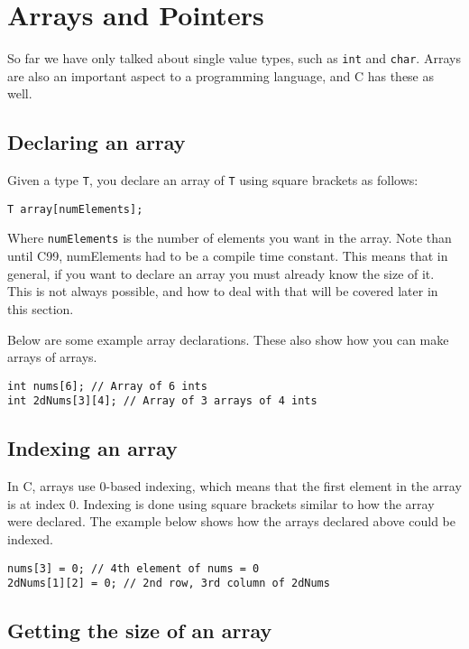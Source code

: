 
\chapter{Arrays and Pointers}

So far we have only talked about single value types, such as \texttt{int} and \texttt{char}.
Arrays are also an important aspect to a programming language, and C has these as well.

\section{Declaring an array}

Given a type \texttt{T}, you declare an array of \texttt{T} using square brackets as follows:

\begin{lstlisting}[numbers=none,frame=none]
T array[numElements];
\end{lstlisting}

Where \texttt{numElements} is the number of elements you want in the array.
Note than until C99, numElements had to be a compile time constant.
This means that in general, if you want to declare an array you must already know the size of it.
This is not always possible, and how to deal with that will be covered later in this section.

Below are some example array declarations.
These also show how you can make arrays of arrays.

\begin{lstlisting}
int nums[6]; // Array of 6 ints
int 2dNums[3][4]; // Array of 3 arrays of 4 ints
\end{lstlisting}

\section{Indexing an array}

In C, arrays use 0-based indexing, which means that the first element in the array is at index 0.
Indexing is done using square brackets similar to how the array were declared.
The example below shows how the arrays declared above could be indexed.

\begin{lstlisting}
nums[3] = 0; // 4th element of nums = 0
2dNums[1][2] = 0; // 2nd row, 3rd column of 2dNums
\end{lstlisting}

\section{Getting the size of an array}

